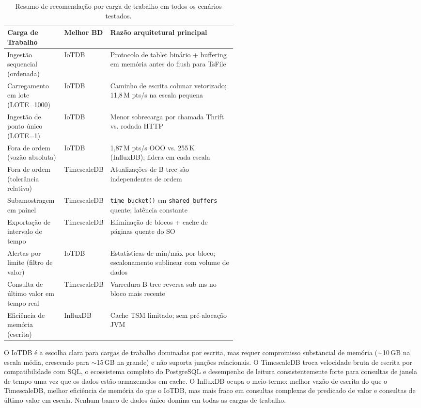 \begin{table}[t]
  \centering
  \caption{Resumo de recomendação por carga de trabalho em todos os cenários testados.}
  \footnotesize
  \label{tab:summary}
  \begin{tabular}{l l p{0.55\linewidth}}
    \hline
    \textbf{Carga de Trabalho} & \textbf{Melhor BD} & \textbf{Razão arquitetural principal} \\
    \hline
    Ingestão sequencial (ordenada)          & IoTDB       & Protocolo de tablet binário + buffering em memória antes do flush para TsFile \\
    Carregamento em lote (LOTE=1000)        & IoTDB       & Caminho de escrita colunar vetorizado; 11,8\,M pts/s na escala pequena \\
    Ingestão de ponto único (LOTE=1)        & IoTDB       & Menor sobrecarga por chamada Thrift vs. rodada HTTP \\
    Fora de ordem (vazão absoluta)          & IoTDB       & 1,87\,M pts/s OOO vs. 255\,K (InfluxDB); lidera em cada escala \\
    Fora de ordem (tolerância relativa)     & TimescaleDB & Atualizações de B-tree são independentes de ordem \\
    Subamostragem em painel                 & TimescaleDB & \texttt{time\_bucket()} em \texttt{shared\_buffers} quente; latência constante \\
    Exportação de intervalo de tempo        & TimescaleDB & Eliminação de blocos + cache de páginas quente do SO \\
    Alertas por limite (filtro de valor)    & IoTDB       & Estatísticas de mín/máx por bloco; escalonamento sublinear com volume de dados \\
    Consulta de último valor em tempo real  & TimescaleDB & Varredura B-tree reversa sub-ms no bloco mais recente \\
    Eficiência de memória (escrita)         & InfluxDB    & Cache TSM limitado; sem pré-alocação JVM \\
    \hline
  \end{tabular}
\end{table}

O IoTDB é a escolha clara para cargas de trabalho dominadas por escrita, mas requer compromisso
substancial de memória ($\sim$10\,GB na escala média, crescendo para $\sim$15\,GB na grande)
e não suporta junções relacionais. O TimescaleDB troca velocidade bruta de escrita por
compatibilidade com SQL, o ecossistema completo do PostgreSQL e desempenho de leitura
consistentemente forte para consultas de janela de tempo uma vez que os dados estão
armazenados em cache. O InfluxDB ocupa o meio-termo: melhor vazão de escrita do que o
TimescaleDB, melhor eficiência de memória do que o IoTDB, mas mais fraco em consultas
complexas de predicado de valor e consultas de último valor em escala. Nenhum banco de dados
único domina em todas as cargas de trabalho.
